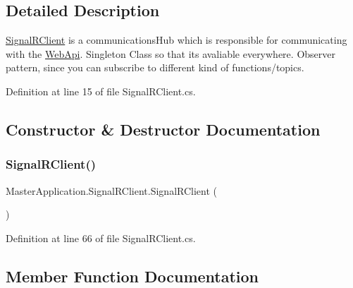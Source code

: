\subsection{Detailed Description}
\mbox{\hyperlink{class_master_application_1_1_signal_r_client}{Signal\+R\+Client}} is a communications\+Hub which is responsible for communicating with the \mbox{\hyperlink{namespace_web_api}{Web\+Api}}. Singleton Class so that it\textquotesingle{}s avaliable everywhere. Observer pattern, since you can subscribe to different kind of functions/topics. 

Definition at line 15 of file Signal\+R\+Client.\+cs.



\subsection{Constructor \& Destructor Documentation}
\mbox{\label{class_master_application_1_1_signal_r_client_a7ada19145378cc311e1b206ebb2378b1}} 
\subsubsection{\texorpdfstring{Signal\+R\+Client()}{SignalRClient()}}
{\footnotesize\ttfamily Master\+Application.\+Signal\+R\+Client.\+Signal\+R\+Client (\begin{DoxyParamCaption}{ }\end{DoxyParamCaption})\hspace{0.3cm}{\ttfamily [private]}}



Definition at line 66 of file Signal\+R\+Client.\+cs.



\subsection{Member Function Documentation}
\mbox{\label{class_master_application_1_1_signal_r_client_a9cb6f0f00bf7784e304dee3a4a9032f5}} 
